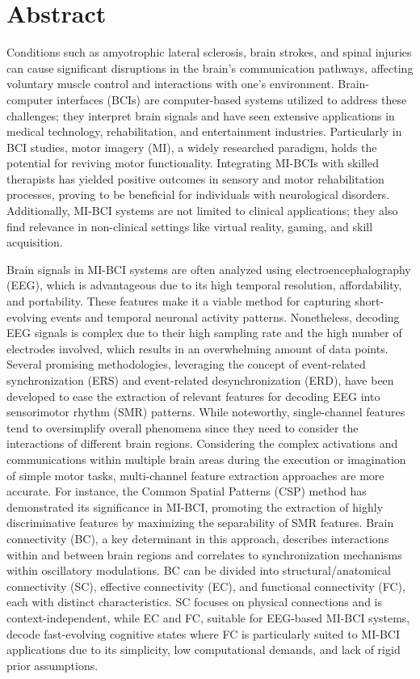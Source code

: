 \chapter*{\sffamily Abstract}
%
\par Conditions such as amyotrophic lateral sclerosis, brain strokes, and spinal injuries can cause significant disruptions in the brain's communication pathways, affecting voluntary muscle control and interactions with one's environment. Brain-computer interfaces (BCIs) are computer-based systems utilized to address these challenges; they interpret brain signals and have seen extensive applications in medical technology, rehabilitation, and entertainment industries. Particularly in BCI studies, motor imagery (MI), a widely researched paradigm, holds the potential for reviving motor functionality. Integrating MI-BCIs with skilled therapists has yielded positive outcomes in sensory and motor rehabilitation processes, proving to be beneficial for individuals with neurological disorders. Additionally, MI-BCI systems are not limited to clinical applications; they also find relevance in non-clinical settings like virtual reality, gaming, and skill acquisition.

Brain signals in MI-BCI systems are often analyzed using electroencephalography (EEG), which is advantageous due to its high temporal resolution, affordability, and portability. These features make it a viable method for capturing short-evolving events and temporal neuronal activity patterns. Nonetheless, decoding EEG signals is complex due to their high sampling rate and the high number of electrodes involved, which results in an overwhelming amount of data points. Several promising methodologies, leveraging the concept of event-related synchronization (ERS) and event-related desynchronization (ERD), have been developed to ease the extraction of relevant features for decoding EEG into sensorimotor rhythm (SMR) patterns. While noteworthy, single-channel features tend to oversimplify overall phenomena since they need to consider the interactions of different brain regions. Considering the complex activations and communications within multiple brain areas during the execution or imagination of simple motor tasks, multi-channel feature extraction approaches are more accurate. For instance, the Common Spatial Patterns (CSP) method has demonstrated its significance in MI-BCI, promoting the extraction of highly discriminative features by maximizing the separability of SMR features. Brain connectivity (BC), a key determinant in this approach, describes interactions within and between brain regions and correlates to synchronization mechanisms within oscillatory modulations. BC can be divided into structural/anatomical connectivity (SC), effective connectivity (EC), and functional connectivity (FC), each with distinct characteristics. SC focuses on physical connections and is context-independent, while EC and FC, suitable for EEG-based MI-BCI systems, decode fast-evolving cognitive states where FC is particularly suited to MI-BCI applications due to its simplicity, low computational demands, and lack of rigid prior assumptions.

